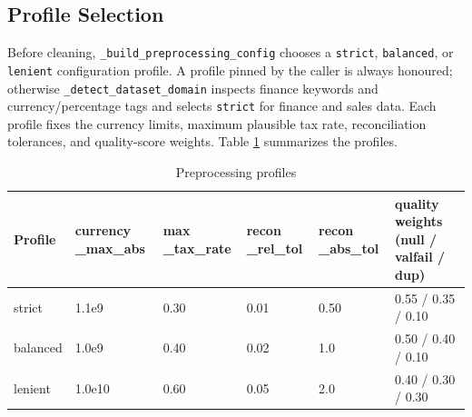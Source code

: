 \documentclass[12pt,a4paper,openany]{report}
\begin{document}
\subsection{Profile Selection}
Before cleaning, \texttt{\_build\_preprocessing\_config} chooses a \texttt{strict}, \texttt{balanced}, or \texttt{lenient} configuration profile. A profile pinned by the caller is always honoured; otherwise \texttt{\_detect\_dataset\_domain} inspects finance keywords and currency/percentage tags and selects \texttt{strict} for finance and sales data. Each profile fixes the currency limits, maximum plausible tax rate, reconciliation tolerances, and quality-score weights. Table \ref{tab:preprocessing-profiles} summarizes the profiles.

\begin{table}[H]
\centering
\caption{Preprocessing profiles}
\label{tab:preprocessing-profiles}
\small
\setlength{\tabcolsep}{4pt}
\begin{tabular}{p{1.7cm} p{1.9cm} p{1.6cm} p{1.7cm} p{1.7cm} p{3.2cm}}
\hline
Profile & currency \_max\_abs & max \_tax\_rate & recon \_rel\_tol & recon \_abs\_tol & quality weights (null / valfail / dup) \\
\hline
strict & 1.1e9 & 0.30 & 0.01 & 0.50 & 0.55 / 0.35 / 0.10 \\
balanced & 1.0e9 & 0.40 & 0.02 & 1.0 & 0.50 / 0.40 / 0.10 \\
lenient & 1.0e10 & 0.60 & 0.05 & 2.0 & 0.40 / 0.30 / 0.30 \\
\hline
\end{tabular}
\end{table}
\end{document}
